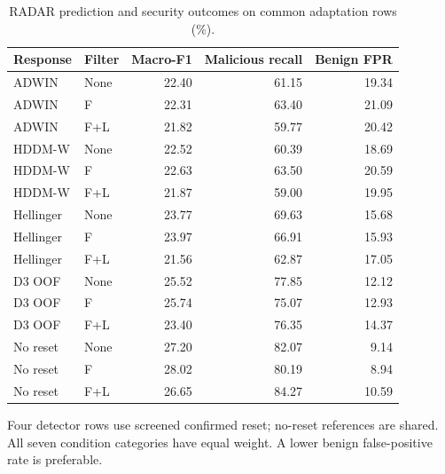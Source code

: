 \begin{table}[htbp]
\centering\small\singlespacing
\caption{RADAR prediction and security outcomes on common adaptation rows (\%).}\label{tab:radar_security}
\setlength{\tabcolsep}{4pt}
\renewcommand{\arraystretch}{1.18}
\begin{tabular}{@{}llrrr@{}}
\toprule
Response & Filter & Macro-F1 & Malicious recall & Benign FPR \\
\midrule
ADWIN & None & 22.40 & 61.15 & 19.34 \\
ADWIN & F & 22.31 & 63.40 & 21.09 \\
ADWIN & F+L & 21.82 & 59.77 & 20.42 \\
HDDM-W & None & 22.52 & 60.39 & 18.69 \\
HDDM-W & F & 22.63 & 63.50 & 20.59 \\
HDDM-W & F+L & 21.87 & 59.00 & 19.95 \\
Hellinger & None & 23.77 & 69.63 & 15.68 \\
Hellinger & F & 23.97 & 66.91 & 15.93 \\
Hellinger & F+L & 21.56 & 62.87 & 17.05 \\
D3 OOF & None & 25.52 & 77.85 & 12.12 \\
D3 OOF & F & 25.74 & 75.07 & 12.93 \\
D3 OOF & F+L & 23.40 & 76.35 & 14.37 \\
No reset & None & 27.20 & 82.07 & 9.14 \\
No reset & F & 28.02 & 80.19 & 8.94 \\
No reset & F+L & 26.65 & 84.27 & 10.59 \\
\bottomrule
\end{tabular}
\par\smallskip\begin{minipage}{\textwidth}\footnotesize Four detector rows use screened confirmed reset; no-reset references are shared. All seven condition categories have equal weight. A lower benign false-positive rate is preferable.\end{minipage}
\end{table}
